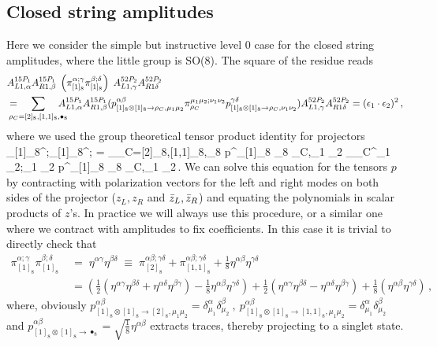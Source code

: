 \subsection{Closed string amplitudes}
Here we consider the simple but instructive level 0 case for the closed string amplitudes, where the little group is SO(8). The square of the residue reads
%
	\begin{align}
\label{eq:level0_closed_so8}
		{}&A^{15P_1}_{L1, \alpha}A^{15P_1}_{R1,\beta} \; \left( \pi_{[1]_8}^{\alpha ;\gamma}\pi_{[1]_8}^{\beta ;\delta} \right) \;  A^{52P_2}_{L1,\gamma}A^{52P_2}_{R1\delta}     \\
		&= \hspace{-.4cm} \sum_{\rho_C=[2]_8,[1,1]_8,\bullet_8} \hspace{-.4cm}   A^{15P_1}_{L1, \alpha}A^{15P_1}_{R1,\beta}(
		p^{\alpha \beta}_{[1]_8 \otimes [1]_8 \to \rho_C,\mu_1 \mu_2}
		\pi_{\rho_C}^{\mu_1 \mu_2;\nu_1 \nu_2}
		p^{\gamma \delta}_{[1]_8 \otimes [1]_8 \to \rho_C,\nu_1 \nu_2})A^{52P_2}_{L1,\gamma}A^{52P_2}_{R1\delta}
		= (\epsilon_1\cdot \epsilon_2)^2  \,,
\nonumber
\end{align}
where we used the group theoretical tensor product identity for projectors
	\beq
	 	\pi_{[1]_8}^{\alpha ;\gamma}\pi_{[1]_8}^{\beta ;\delta} \; = \sum_{\rho_C=[2]_8,[1,1]_8,\bullet_8} p^{\alpha \beta}_{[1]_8 \otimes [1]_8 \to \rho_C,\mu_1 \mu_2}
	 	\pi_{\rho_C}^{\mu_1 \mu_2;\nu_1 \nu_2}
	 	p^{\gamma \delta}_{[1]_8 \otimes [1]_8 \to \rho_C,\nu_1 \nu_2}\,.
	\eeq
We can solve this equation for the tensors $p$ by contracting with polarization vectors for the left and right modes on both sides of the projector ($z_L,z_R$ and $\bar{z}_L,\bar{z}_R$) and equating the polynomials in scalar products of $z$'s. In practice we will always use this procedure, or a similar one where we contract with amplitudes to fix coefficients. In this case it is trivial to directly check that
	\begin{align}
		\pi_{[1]_8}^{\alpha ;\gamma}\pi_{[1]_8}^{\beta ;\delta} \; 
		&= \; \eta^{\alpha \gamma}\eta^{\beta \delta}	\;\equiv \;  \pi_{[2]_8}^{\alpha \beta;\gamma \delta} + \pi_{[1,1]_8}^{\alpha \beta;\gamma \delta} + \frac{1}{8} \eta^{\alpha \beta} \eta^{\gamma \delta}
	\label{eq:level0_closed_check}
	       \\
		& = \left(\frac{1}{2}( \eta^{\alpha \gamma}\eta^{\beta \delta}+\eta^{\alpha \delta}\eta^{\beta \gamma})-\frac{1}{8} \eta^{\alpha \beta}\eta^{\gamma \delta}\right) 
		+ \frac{1}{2}(\eta^{\alpha \gamma}\eta^{\beta \delta}-\eta^{\alpha \delta}\eta^{\beta \gamma}) + \frac{1}{8}(\eta^{\alpha \beta}\eta^{\gamma \delta})\,,
	\nonumber
\end{align}
where, obviously $p^{\alpha \beta}_{[1]_8 \otimes [1]_8 \to [2]_8,\mu_1 \mu_2}=\delta^\alpha_{\mu_1}\delta^\beta_{\mu_2} ~,~p^{\alpha \beta}_{[1]_8 \otimes [1]_8 \to [1,1]_8,\mu_1 \mu_2}=\delta^\alpha_{\mu_1}\delta^\beta_{\mu_2}$ and $p^{\alpha \beta}_{[1]_8 \otimes [1]_8 \to \bullet_8}= \sqrt{\frac{1 }{8}}\eta^{\alpha\beta}$ extracts traces, thereby projecting to a singlet state.
